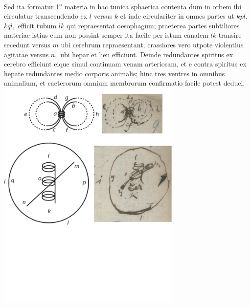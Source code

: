 Sed ita formatur 1\textsuperscript{o} materia in hac tunica sphaerica contenta
dum in orbem ibi circulatur transcendendo ex $l$ versus $k$ et inde circulariter in omnes partes ut $kpl,$ $kql,$ efficit tubum $lk$
qui repraesentat oesophagum;
praeterea partes subtiliores materiae istius cum non possint semper ita facile per istum canalem $lk$ transire
secedunt versus $m$ ubi cerebrum repraesentant;
crassiores vero utpote violentius agitatae versus $n,$ ubi hepar et lien efficiunt.
Deinde redundantes spiritus ex cerebro efficiunt
eique simul continuam venam arteriosam,
et e contra spiritus ex hepate redundantes  medio corporis animalis;
hinc tres ventres in omnibus animalium, et caeterorum omnium membrorum confirmatio facile potest deduci.%
%
\pend
\vspace{2.5em}
\pstart
\centering
\includegraphics[trim = 0mm -3mm 0mm 0mm, clip, width=0.68\textwidth]{images/lh0040104b_009r1.pdf}\\
%
\pend
\count{}
\newpage
